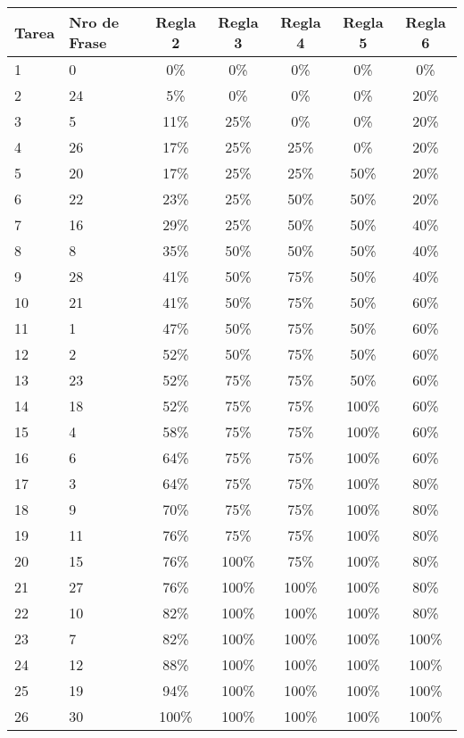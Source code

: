 {\tiny \begin{table}[H]
	\centering
	\begin{tabular}{|l|l|c|c|c|c|c|}
		\hline
		 \textbf{Tarea}  & \textbf{Nro de Frase} &  \textbf{Regla 2} & \textbf{Regla 3} & \textbf{Regla 4} & \textbf{Regla 5} & \textbf{Regla 6} \\ \hline
		1 & 0 & 0\% & 0\% & 0\% & 0\% & 0\%\\ \hline
		2 & 24 & 5\% & 0\% & 0\% & 0\% & 20\% \\ \hline
		3 & 5 & 11\% & 25\% & 0\% & 0\% & 20\% \\ \hline
		4 & 26 & 17\% & 25\% & 25\% & 0\% & 20\%\\ \hline
		5 & 20 & 17\% & 25\% & 25\% & 50\% & 20\%\\ \hline
		6 & 22 & 23\% & 25\% & 50\% & 50\% & 20\%\\ \hline
		7 & 16 & 29\% & 25\% & 50\% & 50\% & 40\%\\ \hline
		8 & 8 & 35\% & 50\% & 50\% & 50\% & 40\%\\ \hline
		9 & 28 & 41\% & 50\% & 75\% & 50\% & 40\%\\ \hline
		10 & 21 & 41\% & 50\% & 75\% & 50\% & 60\%\\ \hline
		11 & 1 &  47\% & 50\% & 75\% & 50\% & 60\%\\ \hline
		12 & 2 &  52\% & 50\% & 75\% & 50\% & 60\%\\ \hline
		13 & 23 & 52\% & 75\% & 75\% & 50\% & 60\%\\ \hline
		14 & 18 & 52\% & 75\% & 75\% & 100\% & 60\%\\ \hline
		15 & 4 &  58\% & 75\% & 75\% & 100\% & 60\%\\ \hline
		16 & 6 &  64\% & 75\% & 75\% & 100\% & 60\%\\ \hline
		17 & 3 &  64\% & 75\% & 75\% & 100\% & 80\% \\ \hline
		18 & 9 &  70\% & 75\% & 75\% & 100\% & 80\%\\ \hline
		19 & 11 & 76\% & 75\% & 75\% & 100\% & 80\%\\ \hline
		20 & 15 & 76\% & 100\% & 75\% & 100\% & 80\%\\ \hline
		21 & 27 & 76\% & 100\% & 100\% & 100\% & 80\%\\ \hline
		22 & 10 & 82\% & 100\% & 100\% & 100\% & 80\% \\ \hline
		23 & 7 &  82\% & 100\% & 100\% & 100\% & 100\% \\ \hline
		24 & 12 & 88\% & 100\% & 100\% & 100\% & 100\%\\ \hline
		25 & 19 & 94\% & 100\% & 100\% & 100\% & 100\% \\ \hline
		26 & 30 & 100\% & 100\% & 100\% & 100\% & 100\% \\ \hline
	\end{tabular}
	\caption{}
	\label{BLA}
\end{table}
}

